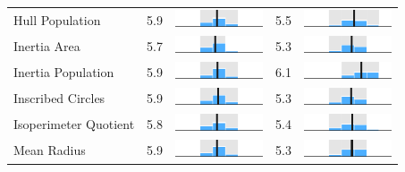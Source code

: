 \begin{table}
\begin{tabular}{l rm{7em} rm{7em}}
Hull Population        &   5.9 &       \includegraphics[width=7em]{mini_hist/NC_race_2012_hull_p} &   5.5 &       \includegraphics[width=7em]{mini_hist/NC_race_2016_hull_p} \\
Inertia Area           &   5.7 &    \includegraphics[width=7em]{mini_hist/NC_race_2012_inertia_a} &   5.3 &    \includegraphics[width=7em]{mini_hist/NC_race_2016_inertia_a} \\
Inertia Population     &   5.9 &    \includegraphics[width=7em]{mini_hist/NC_race_2012_inertia_p} &   6.1 &    \includegraphics[width=7em]{mini_hist/NC_race_2016_inertia_p} \\
Inscribed Circles      &   5.9 &    \includegraphics[width=7em]{mini_hist/NC_race_2012_ehrenburg} &   5.3 &    \includegraphics[width=7em]{mini_hist/NC_race_2016_ehrenburg} \\
Isoperimeter Quotient  &   5.8 &       \includegraphics[width=7em]{mini_hist/NC_race_2012_polsby} &   5.4 &       \includegraphics[width=7em]{mini_hist/NC_race_2016_polsby} \\
Mean Radius            &   5.9 &  \includegraphics[width=7em]{mini_hist/NC_race_2012_mean_radius} &   5.3 &  \includegraphics[width=7em]{mini_hist/NC_race_2016_mean_radius} \\

\end{tabular}
\end{table}
